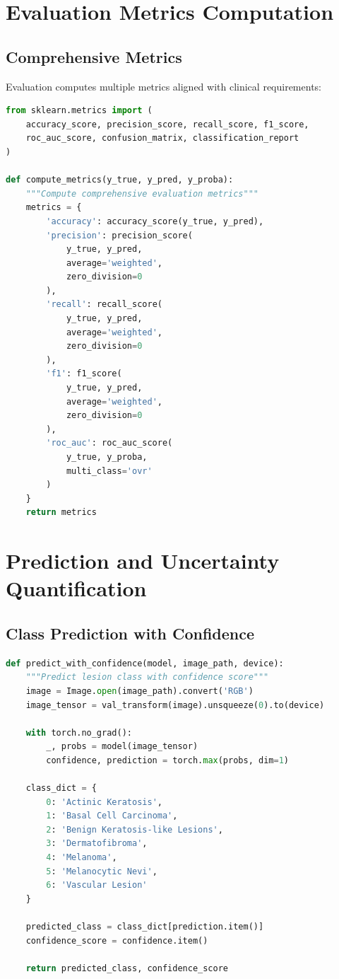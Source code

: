 \section{Evaluation Metrics Computation}

\subsection{Comprehensive Metrics}

Evaluation computes multiple metrics aligned with clinical requirements:

\begin{lstlisting}[language=Python, caption=Metrics Computation]
from sklearn.metrics import (
    accuracy_score, precision_score, recall_score, f1_score,
    roc_auc_score, confusion_matrix, classification_report
)

def compute_metrics(y_true, y_pred, y_proba):
    """Compute comprehensive evaluation metrics"""
    metrics = {
        'accuracy': accuracy_score(y_true, y_pred),
        'precision': precision_score(
            y_true, y_pred, 
            average='weighted', 
            zero_division=0
        ),
        'recall': recall_score(
            y_true, y_pred, 
            average='weighted', 
            zero_division=0
        ),
        'f1': f1_score(
            y_true, y_pred, 
            average='weighted', 
            zero_division=0
        ),
        'roc_auc': roc_auc_score(
            y_true, y_proba, 
            multi_class='ovr'
        )
    }
    return metrics
\end{lstlisting}

\section{Prediction and Uncertainty Quantification}

\subsection{Class Prediction with Confidence}

\begin{lstlisting}[language=Python, caption=Prediction with Confidence]
def predict_with_confidence(model, image_path, device):
    """Predict lesion class with confidence score"""
    image = Image.open(image_path).convert('RGB')
    image_tensor = val_transform(image).unsqueeze(0).to(device)
    
    with torch.no_grad():
        _, probs = model(image_tensor)
        confidence, prediction = torch.max(probs, dim=1)
    
    class_dict = {
        0: 'Actinic Keratosis',
        1: 'Basal Cell Carcinoma',
        2: 'Benign Keratosis-like Lesions',
        3: 'Dermatofibroma',
        4: 'Melanoma',
        5: 'Melanocytic Nevi',
        6: 'Vascular Lesion'
    }
    
    predicted_class = class_dict[prediction.item()]
    confidence_score = confidence.item()
    
    return predicted_class, confidence_score
\end{lstlisting}

